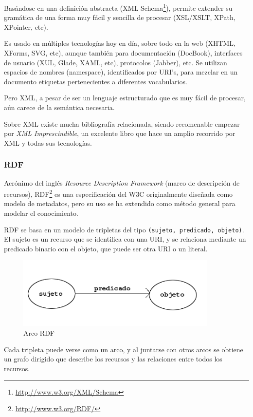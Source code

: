 Basándose en una definición abstracta (XML Schema\footnote{\url{http://www.w3.org/XML/Schema}}), 
permite extender su gramática de una forma muy fácil y sencilla de procesar 
(XSL/XSLT, XPath, XPointer, etc).

Es usado en múltiples tecnologías hoy en día, sobre todo en la web (XHTML, XForms, 
SVG, etc), aunque también para documentación (DocBook), interfaces de usuario (XUL,
Glade, XAML, etc), protocolos (Jabber), etc. Se utilizan espacios de nombres (namespace), 
identificados por URI's, para mezclar en un documento etiquetas pertenecientes a 
diferentes vocabularios.

Pero XML, a pesar de ser un lenguaje estructurado que es muy fácil de procesar, 
aún carece de la semántica necesaria. 

Sobre XML existe mucha bibliografía relacionada, siendo recomenable empezar por
\emph{XML Imprescindible}\cite{XMLNutshell}, un excelente libro que hace un amplio
recorrido por XML y todas sus tecnologías.

\subsubsection{RDF}

Acrónimo del inglés \emph{Resource Description Framework} (marco de descripción 
de recursos), RDF\footnote{\url{http://www.w3.org/RDF/}} es una especificación del 
W3C originalmente diseñada como modelo de metadatos, pero su uso se ha extendido como
método general para modelar el conocimiento.

RDF se basa en un modelo de tripletas del tipo \texttt{(sujeto, predicado, objeto)}. El
sujeto es un recurso que se identifica con una URI, y se relaciona mediante un 
predicado binario con el objeto, que puede ser otra URI o un literal.

\begin{figure}[H]
	\centering
	\includegraphics[width=10cm]{images/arc.png}
	\caption{Arco RDF}
	\label{fig:rdfTriplet}
\end{figure}

Cada tripleta puede verse como un arco, y al juntarse con otros arcos se obtiene
un grafo dirigido que describe los recursos y las relaciones entre todos los 
recursos.

